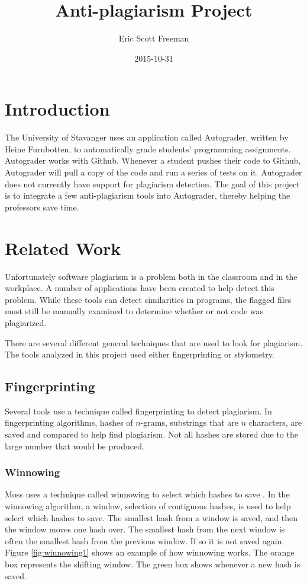\documentclass[12pt]{article}
\title{Anti-plagiarism Project}
\date{2015-10-31}
\author{Eric Scott Freeman}
\begin{document}
	\maketitle
	\newpage
	\tableofcontents
	\newpage
	\section{Introduction}
		The University of Stavanger uses an application called Autograder, written by Heine Furubotten, to automatically grade students' programming assignments. Autograder works with Github. Whenever a student pushes their code to Github, Autograder will pull a copy of the code and run a series of tests on it. Autograder does not currently have support for plagiarism detection. The goal of this project is to integrate a few anti-plagiarism tools into Autograder, thereby helping the professors save time.
		
	\section{Related Work}
		Unfortunately software plagiarism is a problem both in the classroom and in the workplace. A number of applications have been created to help detect this problem. While these tools can detect similarities in programs, the flagged files must still be manually examined to determine whether or not code was plagiarized.
		
		There are several different general techniques that are used to look for plagiarism. The tools analyzed in this project used either fingerprinting or stylometry.
	
		\subsection{Fingerprinting}
			Several tools use a technique called fingerprinting to detect plagiarism. In fingerprinting algorithms, hashes of $n$-grams, substrings that are $n$ characters, are saved and compared to help find plagiarism. Not all hashes are stored due to the large number that would be produced. 
		
			\subsubsection{Winnowing}
				Moss uses a technique called winnowing to select which hashes to save \cite{schleimer+wilkerson+aiken}. In the winnowing algorithm, a window, selection of contiguous hashes, is used to help select which hashes to save. The smallest hash from a window is saved, and then the window moves one hash over. The smallest hash from the next window is often the smallest hash from the previous window. If so it is not saved again. Figure \ref{fig:winnowing1} shows an example of how winnowing works. The orange box represents the shifting window. The green box shows whenever a new hash is saved.
				
\end{document}
